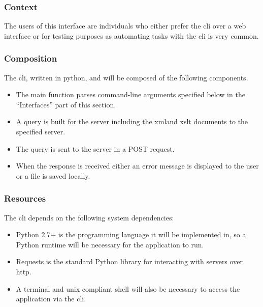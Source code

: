 \begin{enmerate}
\begin{itemzie}
\subsubsection{Context}

The users of this interface are individuals who either prefer the \gls{cli} over a web interface or for testing purposes as automating tasks with the \gls{cli} is very common.

\subsubsection{Composition}

The \gls{cli}, written in \gls{python}, and will be composed of the following components.

\begin{itemize}
  \item The main function parses command-line arguments specified below in the ``Interfaces'' part of this section.
    \item A query is built for the server including the \gls{xml}and \gls{xslt} documents to the specified server.
    \item The query is sent to the server in a POST request.
    \item When the response is received either an error message is displayed to the user or a file is saved locally.
\end{itemize}

\subsubsection{Resources}

The \gls{cli} depends on the following system dependencies:

\begin{itemize}
  \item {Python 2.7+} is the programming language it will be implemented in, so a Python runtime will be necessary for the application to run.
    \item {Requests} is the standard Python library for interacting with servers over \gls{http}.
    \item {A terminal and \gls{unix} compliant shell} will also be necessary to access the application via the \gls{cli}.
\end{itemize}


\end{itemzie}
\end{enmerate}

